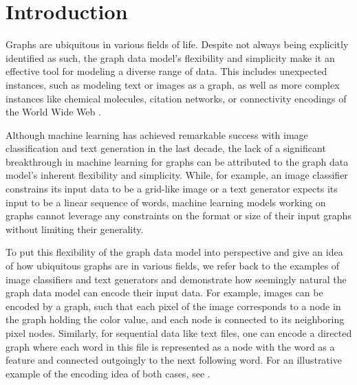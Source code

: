 \section{Introduction}
Graphs are ubiquitous in various fields of life. Despite not always being explicitly identified as such, the graph data model's flexibility and simplicity make it an effective tool for modeling a diverse range of data. This includes unexpected instances, such as modeling text or images as a graph, as well as more complex instances like chemical molecules, citation networks, or connectivity encodings of the World Wide Web \cite{Mor+2020, Sca+2009}.

Although machine learning has achieved remarkable success with image classification and text generation in the last decade, the lack of a significant breakthrough in machine learning for graphs can be attributed to the graph data model's inherent flexibility and simplicity. While, for example, an image classifier constrains its input data to be a grid-like image or a text generator expects its input to be a linear sequence of words, machine learning models working on graphs cannot leverage any constraints on the format or size of their input graphs without limiting their generality. 

To put this flexibility of the graph data model into perspective and give an idea of how ubiquitous graphs are in various fields, we refer back to the examples of image classifiers and text generators and demonstrate how seemingly natural the graph data model can encode their input data. For example, images can be encoded by a graph, such that each pixel of the image corresponds to a node in the graph holding the color value, and each node is connected to its neighboring pixel nodes. Similarly, for sequential data like text files, one can encode a directed graph where each word in this file is represented as a node with the word as a feature and connected outgoingly to the next following word. For an illustrative example of the encoding idea of both cases, see .

